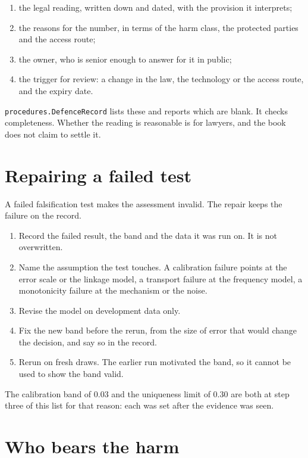\begin{enumerate}
\item the legal reading, written down and dated, with the provision it interprets;
\item the reasons for the number, in terms of the harm class, the protected parties and the
access route;
\item the owner, who is senior enough to answer for it in public;
\item the trigger for review: a change in the law, the technology or the access route, and the
expiry date.
\end{enumerate}

\texttt{procedures.DefenceRecord} lists these and reports which are blank. It checks
completeness. Whether the reading is reasonable is for lawyers, and the book does not claim to
settle it.

\section{Repairing a failed test}\label{app:b-repair}

A failed falsification test makes the assessment invalid. The repair keeps the failure on the
record.

\begin{enumerate}
\item Record the failed result, the band and the data it was run on. It is not overwritten.
\item Name the assumption the test touches. A calibration failure points at the error scale or
the linkage model, a transport failure at the frequency model, a monotonicity failure at the
mechanism or the noise.
\item Revise the model on development data only.
\item Fix the new band before the rerun, from the size of error that would change the
decision, and say so in the record.
\item Rerun on fresh draws. The earlier run motivated the band, so it cannot be used to show
the band valid.
\end{enumerate}

The calibration band of 0.03 and the uniqueness limit of 0.30 are both at step three of this
list for that reason: each was set after the evidence was seen.

\section{Who bears the harm}\label{app:b-ethics}

